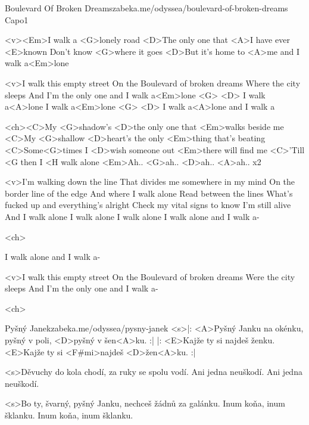 \begin{song}{52}{Boulevard Of Broken Dreams}{zabeka.me/odyssea/boulevard-of-broken-dreams}
	Capo1

	<v><Em>I walk a <G>lonely road
	<D>The only one that <A>I have ever <E>known
	Don't know <G>where it goes
	<D>But it's home to <A>me and I walk a<Em>lone

	<v>I walk this empty street
	On the Boulevard of broken dreams
	Where the city sleeps
	And I'm the only one and I walk a<Em>lone <G>
	<D> I walk a<A>lone I walk a<Em>lone <G>
	<D> I walk a<A>lone and I walk a

	<ch><C>My <G>shadow's <D>the only one that <Em>walks beside me
	<C>My <G>shallow <D>heart's the only <Em>thing that's beating
	<C>Some<G>times I <D>wish someone out <Em>there will find me
	<C>'Till <G then I <H walk alone
	<Em>Ah.. <G>ah.. <D>ah.. <A>ah.. x2

	<v>I'm walking down the line
	That divides me somewhere in my mind
	On the border line of the edge
	And where I walk alone
	Read between the lines
	What's fucked up and everything's alright
	Check my vital signs to know I'm still alive
	And I walk alone
	I walk alone I walk alone
	I walk alone and I walk a-

	<ch>

	I walk alone and I walk a-

	<v>I walk this empty street
	On the Boulevard of broken dreams
	Were the city sleeps
	And I'm the only one and I walk a-

	<ch>

\end{song}
\begin{song}{53}{Pyšný Janek}{zabeka.me/odyssea/pysny-janek}
	<s>|: <A>Pyšný Janku na okénku,
	pyšný v poli, <D>pyšný v šen<A>ku. :|
	|: <E>Kajže ty si najdeš ženku.
	<E>Kajže ty si <F#mi>najdeš <D>žen<A>ku. :|

	<s>Děvuchy do kola chodí, za ruky se spolu vodí.
	Ani jedna neuškodí. Ani jedna neuškodí.

	<s>Bo ty, švarný, pyšný Janku, nechceš žádnů za galánku.
	Inum koňa, inum šklanku. Inum koňa, inum šklanku.

\end{song}
